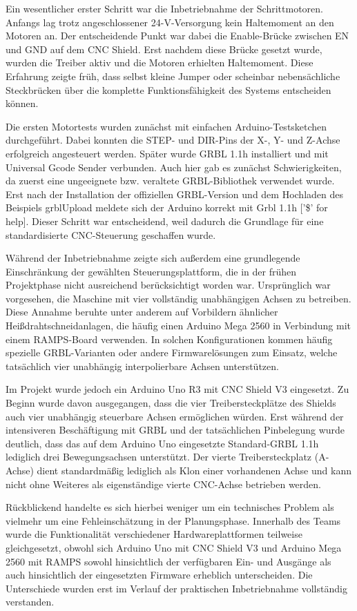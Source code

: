 Ein wesentlicher erster Schritt war die Inbetriebnahme der Schrittmotoren. Anfangs lag trotz angeschlossener 24-V-Versorgung kein Haltemoment an den Motoren an. Der entscheidende Punkt war dabei die Enable-Brücke zwischen EN und GND auf dem CNC Shield. Erst nachdem diese Brücke gesetzt wurde, wurden die Treiber aktiv und die Motoren erhielten Haltemoment. Diese Erfahrung zeigte früh, dass selbst kleine Jumper oder scheinbar nebensächliche Steckbrücken über die komplette Funktionsfähigkeit des Systems entscheiden können.

Die ersten Motortests wurden zunächst mit einfachen Arduino-Testsketchen durchgeführt. Dabei konnten die STEP- und DIR-Pins der X-, Y- und Z-Achse erfolgreich angesteuert werden. Später wurde GRBL 1.1h installiert und mit Universal Gcode Sender verbunden. Auch hier gab es zunächst Schwierigkeiten, da zuerst eine ungeeignete bzw. veraltete GRBL-Bibliothek verwendet wurde. Erst nach der Installation der offiziellen GRBL-Version und dem Hochladen des Beispiels grblUpload meldete sich der Arduino korrekt mit Grbl 1.1h ['\$' for help]. Dieser Schritt war entscheidend, weil dadurch die Grundlage für eine standardisierte CNC-Steuerung geschaffen wurde.

Während der Inbetriebnahme zeigte sich außerdem eine grundlegende Einschränkung der gewählten Steuerungsplattform, die in der frühen Projektphase nicht ausreichend berücksichtigt worden war. Ursprünglich war vorgesehen, die Maschine mit vier vollständig unabhängigen Achsen zu betreiben. Diese Annahme beruhte unter anderem auf Vorbildern ähnlicher Heißdrahtschneidanlagen, die häufig einen Arduino Mega 2560 in Verbindung mit einem RAMPS-Board verwenden. In solchen Konfigurationen kommen häufig spezielle GRBL-Varianten oder andere Firmwarelösungen zum Einsatz, welche tatsächlich vier unabhängig interpolierbare Achsen unterstützen.

Im Projekt wurde jedoch ein Arduino Uno R3 mit CNC Shield V3 eingesetzt. Zu Beginn wurde davon ausgegangen, dass die vier Treibersteckplätze des Shields auch vier unabhängig steuerbare Achsen ermöglichen würden. Erst während der intensiveren Beschäftigung mit GRBL und der tatsächlichen Pinbelegung wurde deutlich, dass das auf dem Arduino Uno eingesetzte Standard-GRBL 1.1h lediglich drei Bewegungsachsen unterstützt. Der vierte Treibersteckplatz (A-Achse) dient standardmäßig lediglich als Klon einer vorhandenen Achse und kann nicht ohne Weiteres als eigenständige vierte CNC-Achse betrieben werden.

Rückblickend handelte es sich hierbei weniger um ein technisches Problem als vielmehr um eine Fehleinschätzung in der Planungsphase. Innerhalb des Teams wurde die Funktionalität verschiedener Hardwareplattformen teilweise gleichgesetzt, obwohl sich Arduino Uno mit CNC Shield V3 und Arduino Mega 2560 mit RAMPS sowohl hinsichtlich der verfügbaren Ein- und Ausgänge als auch hinsichtlich der eingesetzten Firmware erheblich unterscheiden. Die Unterschiede wurden erst im Verlauf der praktischen Inbetriebnahme vollständig verstanden.

